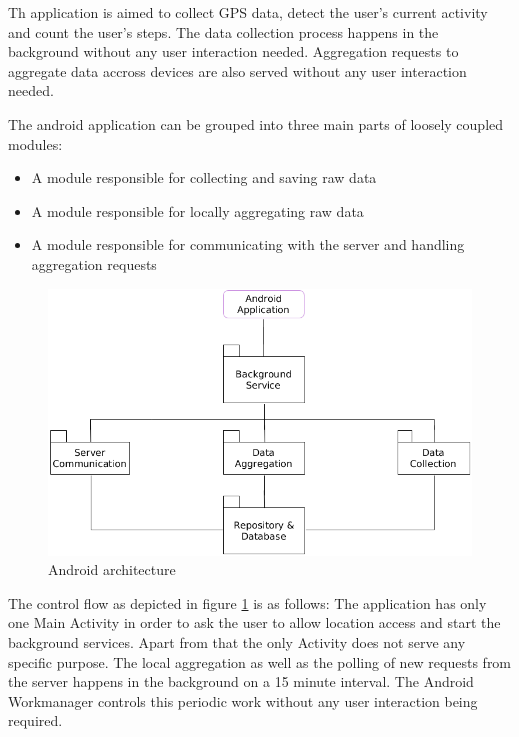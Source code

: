 Th application is aimed to collect GPS data, detect the user's current activity and count the user's steps. The data collection process happens in the background without any user interaction needed. Aggregation requests to aggregate data accross devices are also served without any user interaction needed.
\begin{samepage}
The android application can be grouped into three main parts of loosely coupled modules:
\begin{itemize}
	\item A module responsible for collecting and saving raw data
	\item A module responsible for locally aggregating raw data
	\item A module responsible for communicating with the server and handling aggregation requests
\end{itemize}
\end{samepage}

\begin{figure}[h!]
  \caption{Android architecture}
  \label{android-overview}
  \includegraphics[width=\textwidth]{data/diagrams/android-architecture.png}
\end{figure}

The control flow as depicted in figure \ref{android-overview} is as follows: 
The application has only one Main Activity in order to ask the user to allow location access and start the background services. Apart from that the only Activity does not serve any specific purpose. 
The local aggregation as well as the polling of new requests from the server happens in the background on a 15 minute interval. The Android Workmanager controls this periodic work without any user interaction being required.

